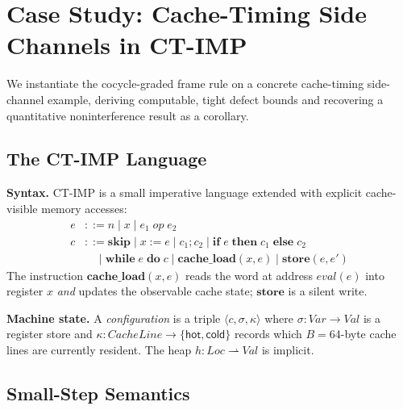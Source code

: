 
\section{Case Study: Cache-Timing Side Channels in CT-IMP}
\label{sec:case-study}

We instantiate the cocycle-graded frame rule on a concrete
cache-timing side-channel example, deriving computable, tight
defect bounds and recovering a quantitative noninterference
result as a corollary.

\subsection{The CT-IMP Language}
\label{sec:ctimp}

\textbf{Syntax.}  CT-IMP is a small imperative language extended with
explicit cache-visible memory accesses:
\begin{align*}
  e &::= n \mid x \mid e_1 \mathop{\mathit{op}} e_2 \\
  c &::= \mathbf{skip} \mid x \mathbin{:=} e \mid c_1 \mathbin{;} c_2
       \mid \mathbf{if}\; e\; \mathbf{then}\; c_1\; \mathbf{else}\; c_2 \\
    &\quad\mid \mathbf{while}\; e\; \mathbf{do}\; c
       \mid \mathbf{cache\_load}(x, e)
       \mid \mathbf{store}(e, e')
\end{align*}
The instruction $\mathbf{cache\_load}(x, e)$ reads the word at address
$\mathit{eval}(e)$ into register $x$ \emph{and} updates the
observable cache state; $\mathbf{store}$ is a silent write.

\textbf{Machine state.}
A \emph{configuration} is a triple $\langle c,\sigma,\kappa\rangle$
where $\sigma : \mathit{Var} \to \mathit{Val}$ is a register store and
$\kappa : \mathit{CacheLine} \to \{\mathsf{hot},\mathsf{cold}\}$
records which $B = 64$-byte cache lines are currently resident.
The heap $h : \mathit{Loc} \rightharpoonup \mathit{Val}$ is implicit.

\subsection{Small-Step Semantics}
\label{sec:semantics}

